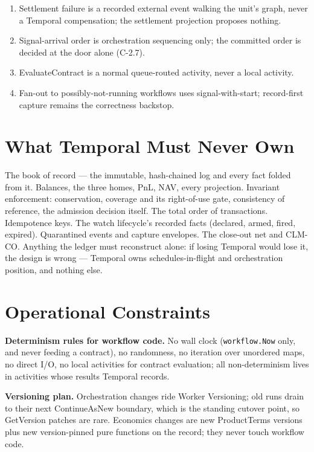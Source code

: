\documentclass[11pt,a4paper]{article}
\begin{document}
\begin{enumerate}[label=\textbf{R-\arabic*.}, leftmargin=*, itemsep=1pt]
\item Settlement failure is a recorded external event walking the unit's graph, never a
  Temporal compensation; the settlement projection proposes nothing.
\item Signal-arrival order is orchestration sequencing only; the committed order is
  decided at the door alone (C-2.7).
\item EvaluateContract is a normal queue-routed activity, never a local activity.
\item Fan-out to possibly-not-running workflows uses signal-with-start; record-first
  capture remains the correctness backstop.
\end{enumerate}

\section{What Temporal Must Never Own}

The book of record --- the immutable, hash-chained log and every fact folded from it.
Balances, the three homes, PnL, NAV, every projection. Invariant enforcement:
conservation, coverage and its right-of-use gate, consistency of reference, the
admission decision itself. The total order of transactions. Idempotence keys. The watch
lifecycle's recorded facts (declared, armed, fired, expired). Quarantined events and
capture envelopes. The close-out net and CLM-CO. Anything the ledger must reconstruct
alone: if losing Temporal would lose it, the design is wrong --- Temporal owns
schedules-in-flight and orchestration position, and nothing else.

\section{Operational Constraints}

\textbf{Determinism rules for workflow code.} No wall clock (\texttt{workflow.Now} only,
and never feeding a contract), no randomness, no iteration over unordered maps, no
direct I/O, no local activities for contract evaluation; all non-determinism lives in
activities whose results Temporal records.

\textbf{Versioning plan.} Orchestration changes ride Worker Versioning; old runs drain
to their next ContinueAsNew boundary, which is the standing cutover point, so GetVersion
patches are rare. Economics changes are new ProductTerms versions plus new version-pinned
pure functions on the record; they never touch workflow code.
\end{document}
